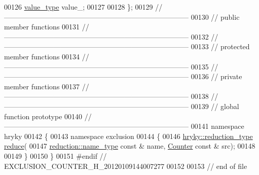 \begin{DoxyCode}
00126     \hyperlink{classhryky_1_1exclusion_1_1_counter_ab326191a15b6c67f8071a7a2b138d1f0}{value_type}              value\_;
00127 
00128 \};
00129 \textcolor{comment}{//
      ------------------------------------------------------------------------------}
00130 \textcolor{comment}{// public member functions}
00131 \textcolor{comment}{//
      ------------------------------------------------------------------------------}
00132 \textcolor{comment}{//
      ------------------------------------------------------------------------------}
00133 \textcolor{comment}{// protected member functions}
00134 \textcolor{comment}{//
      ------------------------------------------------------------------------------}
00135 \textcolor{comment}{//
      ------------------------------------------------------------------------------}
00136 \textcolor{comment}{// private member functions}
00137 \textcolor{comment}{//
      ------------------------------------------------------------------------------}
00138 \textcolor{comment}{//
      ------------------------------------------------------------------------------}
00139 \textcolor{comment}{// global function prototype}
00140 \textcolor{comment}{//
      ------------------------------------------------------------------------------}
00141 \textcolor{keyword}{namespace }hryky
00142 \{
00143 \textcolor{keyword}{namespace }exclusion
00144 \{
00146     \hyperlink{classhryky_1_1_intrusive_ptr}{hryky::reduction_type} \hyperlink{namespacehryky_1_1exclusion_a6368f8766a2da3f808cb0a652ba84e62}{reduce}(
00147         \hyperlink{classhryky_1_1reduction_1_1_string}{reduction::name_type} \textcolor{keyword}{const} & name, \hyperlink{classhryky_1_1exclusion_1_1_counter}{Counter} \textcolor{keyword}{const} & src);
00148 
00149 \}
00150 \}
00151 \textcolor{preprocessor}{#endif // EXCLUSION\_COUNTER\_H\_20120109144007277}
00152 \textcolor{preprocessor}{}
00153 \textcolor{comment}{// end of file}
\end{DoxyCode}
